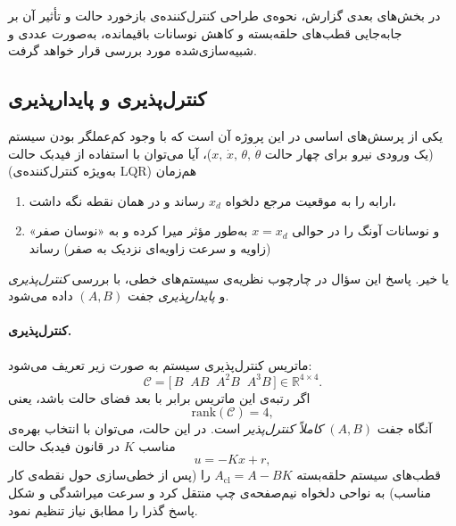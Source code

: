 \documentclass[a4paper,12pt]{article}
\begin{document}
در بخش‌های بعدی گزارش، نحوه‌ی طراحی کنترل‌کننده‌ی بازخورد حالت و تأثیر آن بر جابه‌جایی قطب‌های حلقه‌بسته و کاهش نوسانات باقیمانده، به‌صورت عددی و شبیه‌سازی‌شده مورد بررسی قرار خواهد گرفت.

\subsection{کنترل‌پذیری و پایدارپذیری}
\label{subsec:controllability_stabilizability}

یکی از پرسش‌های اساسی در این پروژه آن است که
با وجود کم‌عملگر بودن سیستم (یک ورودی نیرو برای چهار حالت
$x,\,\dot{x},\,\theta,\,\dot{\theta}$)،
آیا می‌توان با استفاده از فیدبک حالت (به‌ویژه کنترل‌کننده‌ی LQR)
هم‌زمان
\begin{enumerate}
    \item ارابه را به موقعیت مرجع دلخواه $x_d$ رساند و در همان نقطه نگه داشت،
    \item و نوسانات آونگ را در حوالی $x = x_d$ به‌طور مؤثر میرا کرده و به «نوسان صفر» (زاویه و سرعت زاویه‌ای نزدیک به صفر) رساند
\end{enumerate}
یا خیر.
پاسخ این سؤال در چارچوب نظریه‌ی سیستم‌های خطی،
با بررسی \emph{کنترل‌پذیری} و \emph{پایدارپذیری} جفت $(A,B)$ داده می‌شود.

\paragraph{کنترل‌پذیری.}
ماتریس کنترل‌پذیری سیستم به صورت زیر تعریف می‌شود:
\begin{equation}
    \mathcal{C} =
    \big[\, B \;\; A B \;\; A^2 B \;\; A^3 B \,\big]
    \in \mathbb{R}^{4\times 4}.
\end{equation}
اگر رتبه‌ی این ماتریس برابر با بعد فضای حالت باشد، یعنی
\begin{equation}
    \mathrm{rank}(\mathcal{C}) = 4,
\end{equation}
آنگاه جفت $(A,B)$ \emph{کاملاً کنترل‌پذیر} است.
در این حالت، می‌توان با انتخاب بهره‌ی مناسب $K$ در قانون فیدبک حالت
\[
    u = -Kx + r,
\]
قطب‌های سیستم حلقه‌بسته
\(
A_{\mathrm{cl}} = A - BK
\)
را (پس از خطی‌سازی حول نقطه‌ی کار مناسب) به نواحی دلخواه نیم‌صفحه‌ی چپ منتقل کرد و سرعت میراشدگی و شکل پاسخ گذرا را مطابق نیاز تنظیم نمود.
\end{document}
